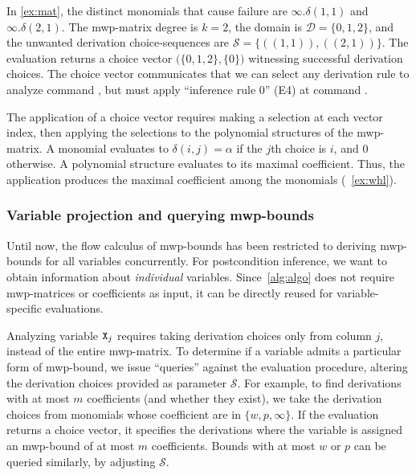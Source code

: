 \begin{example}\label{ex:derivable}
In \autoref{ex:mat}, the distinct monomials that cause failure are \(\infty.\delta(1,1)\) and  \(\infty.\delta(2,1)\).
The mwp-matrix degree is \(k=2\), the domain is \(\mathcal{D}=\{0,1,2\}\), and the unwanted derivation choice-sequences are \(\mathcal{S} = \{ ((1,1)), ((2,1)) \}\).
The evaluation returns a choice vector \(\big(\{0,1,2\}, \{0\}\big)\) witnessing successful derivation choices.
The choice vector communicates that we can select any derivation rule to analyze command , but must apply \enquote{inference rule 0} (E4) at command .
\end{example}

The application of a choice vector requires making a selection at each vector index, then applying the selections to the polynomial structures of the mwp-matrix.
A monomial evaluates to \(\delta(i, j) = \alpha\) if the \(j\)th choice is \(i\), and \(0\) otherwise.
A polynomial structure evaluates to its maximal coefficient.
Thus, the application produces the maximal coefficient among the monomials (\cf~\autoref{ex:whl}).

\subsubsection{Variable projection and querying mwp-bounds}
\label{subsec:query}

Until now, the flow calculus of mwp-bounds has been restricted to deriving mwp-bounds for all variables concurrently.
For postcondition inference, we want to obtain information about \emph{individual} variables.
Since~\autoref{alg:algo} does not require mwp-matrices or coefficients as input, it can be directly reused for variable-specific evaluations.

Analyzing variable \(\prm{X}_j\) requires taking derivation choices only from column \(j\), instead of the entire mwp-matrix.
To determine if a variable admits a particular form of mwp-bound, we issue \enquote{queries} against the evaluation procedure,
altering the derivation choices provided as parameter \(\mathcal{S}\).
For example, to find derivations with at most \(m\) coefficients (and whether they exist), we take the derivation choices from monomials whose coefficient are in \(\{w, p,\infty\}\).
If the evaluation returns a choice vector, it specifies the derivations where the variable is assigned an mwp-bound of at most \(m\) coefficients.
Bounds with at most \(w\) or \(p\) can be queried similarly, by adjusting \(\mathcal{S}\).

